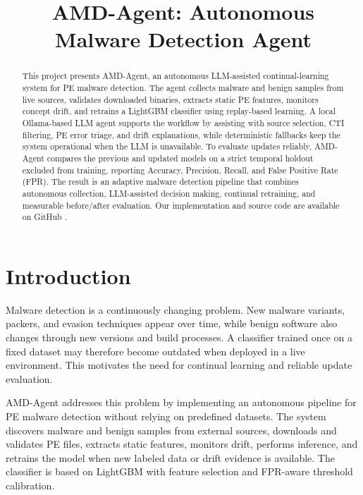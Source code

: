 \documentclass[letterpaper,10pt,conference]{ieeeconf}
\title{\LARGE \bf AMD-Agent: Autonomous Malware Detection Agent}
\author{
\IEEEauthorblockN{Baruh Ifraimov\textsuperscript{1} and Dor Cohen\textsuperscript{1}}
\IEEEauthorblockA{Department of Cyber Security\\
Ariel University Center of Samaria, Ariel, Israel}
}
\begin{document}
\maketitle
\thispagestyle{empty}
\pagestyle{empty}

\begin{abstract}
This project presents AMD-Agent, an autonomous LLM-assisted continual-learning system for PE malware detection. The agent collects malware and benign samples from live sources, validates downloaded binaries, extracts static PE features, monitors concept drift, and retrains a LightGBM classifier using replay-based learning. A local Ollama-based LLM agent supports the workflow by assisting with source selection, CTI filtering, PE error triage, and drift explanations, while deterministic fallbacks keep the system operational when the LLM is unavailable. To evaluate updates reliably, AMD-Agent compares the previous and updated models on a strict temporal holdout excluded from training, reporting Accuracy, Precision, Recall, and False Positive Rate (FPR). The result is an adaptive malware detection pipeline that combines autonomous collection, LLM-assisted decision making, continual retraining, and measurable before/after evaluation.
Our implementation and source code are available on GitHub \cite{amdagentgithub}.
\end{abstract}

\section{Introduction}

Malware detection is a continuously changing problem. New malware variants, packers, and evasion techniques appear over time, while benign software also changes through new versions and build processes. A classifier trained once on a fixed dataset may therefore become outdated when deployed in a live environment. This motivates the need for continual learning and reliable update evaluation.

AMD-Agent addresses this problem by implementing an autonomous pipeline for PE malware detection without relying on predefined datasets. The system discovers malware and benign samples from external sources, downloads and validates PE files, extracts static features, monitors drift, performs inference, and retrains the model when new labeled data or drift evidence is available. The classifier is based on LightGBM with feature selection and FPR-aware threshold calibration.
\end{document}
